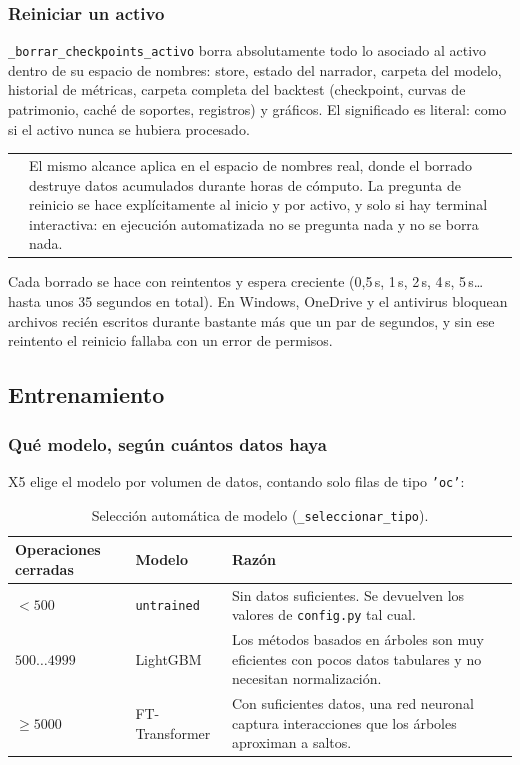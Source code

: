 \documentclass[11pt,a4paper]{article}
\makeatletter
\newcommand{\code}[1]{\texttt{\small #1}}
\newenvironment{nota}{%
  \par\medskip\noindent
  \begin{tabular}{@{}p{0.4em}@{\hspace{8pt}}p{\dimexpr\linewidth-2em\relax}@{}}
  \textcolor{cnaranja}{\rule{3pt}{1.1em}} &
}{\end{tabular}\par\medskip}
\newcommand{\bigsep}{\par\vspace{3pt}}
\makeatother
\begin{document}
\subsubsection{Reiniciar un activo}

\code{_borrar_checkpoints_activo} borra absolutamente todo lo asociado al activo dentro de su
espacio de nombres: store, estado del narrador, carpeta del modelo, historial de métricas,
carpeta completa del backtest (checkpoint, curvas de patrimonio, caché de soportes, registros)
y gráficos. El significado es literal: como si el activo nunca se hubiera procesado.

\begin{nota}
El mismo alcance aplica en el espacio de nombres real, donde el borrado destruye datos
acumulados durante horas de cómputo. La pregunta de reinicio se hace explícitamente al
inicio y por activo, y solo si hay terminal interactiva: en ejecución automatizada no se
pregunta nada y no se borra nada.
\end{nota}

\bigsep
Cada borrado se hace con reintentos y espera creciente (0,5\,s, 1\,s, 2\,s, 4\,s, 5\,s\dots
hasta unos 35 segundos en total). En Windows, OneDrive y el antivirus bloquean archivos
recién escritos durante bastante más que un par de segundos, y sin ese reintento el
reinicio fallaba con un error de permisos.

\subsection{Entrenamiento}

\subsubsection{Qué modelo, según cuántos datos haya}

X5 elige el modelo por volumen de datos, contando solo filas de tipo \code{'oc'}:

\begin{table}[h]
\centering
\small
\begin{tabularx}{\linewidth}{@{}l l X@{}}
\toprule
\textbf{Operaciones cerradas} & \textbf{Modelo} & \textbf{Razón} \\
\midrule
$< 500$ & \code{untrained} & Sin datos suficientes. Se devuelven los valores de \code{config.py} tal cual. \\
$500 \dots 4999$ & LightGBM & Los métodos basados en árboles son muy eficientes con pocos datos tabulares y no necesitan normalización. \\
$\ge 5000$ & FT-Transformer & Con suficientes datos, una red neuronal captura interacciones que los árboles aproximan a saltos. \\
\bottomrule
\end{tabularx}
\caption{Selección automática de modelo (\code{_seleccionar_tipo}).}
\end{table}
\end{document}
